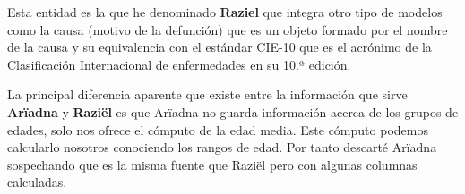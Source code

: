 Esta entidad es la que he denominado \textbf{Raziel} que integra otro tipo de modelos como
la causa (motivo de la defunción) que es un objeto formado por el nombre de la causa y su
equivalencia con el estándar \gls{CIE-10} que es el acrónimo de la Clasificación
Internacional de enfermedades en su 10.ª edición.

La principal diferencia aparente que existe entre la información que sirve
\textbf{Arïadna} y \textbf{Raziël} es que Arïadna no guarda información acerca de los
grupos de edades, solo nos ofrece el cómputo de la edad media. Este cómputo podemos
calcularlo nosotros conociendo los rangos de edad. Por tanto descarté Arïadna sospechando
que es la misma fuente que Raziël pero con algunas columnas calculadas.